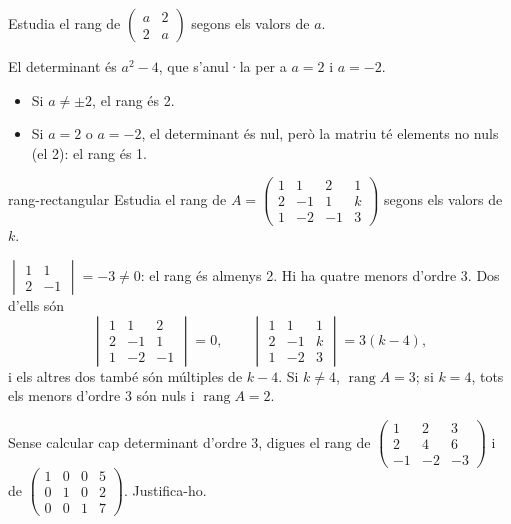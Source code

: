 \begin{apartats}

Estudia el rang de $\begin{pmatrix}a&2\\2&a\end{pmatrix}$ segons els valors de $a$.

\begin{solucio}
El determinant és $a^2-4$, que s'anul·la per a $a=2$ i $a=-2$.
\begin{itemize}
\item Si $a\ne\pm2$, el rang és 2.
\item Si $a=2$ o $a=-2$, el determinant és nul, però la matriu té elements no nuls (el 2): el rang és 1.
\end{itemize}
\end{solucio}

\begin{tria}{rang-rectangular}
Estudia el rang de $A=\begin{pmatrix}1&1&2&1\\2&-1&1&k\\1&-2&-1&3\end{pmatrix}$ segons els valors de $k$.

\begin{solucio}
$\begin{vmatrix}1&1\\2&-1\end{vmatrix}=-3\ne0$: el rang és almenys 2. Hi ha quatre menors d'ordre 3. Dos
d'ells són
\[
\begin{vmatrix}1&1&2\\2&-1&1\\1&-2&-1\end{vmatrix}=0,\qquad
\begin{vmatrix}1&1&1\\2&-1&k\\1&-2&3\end{vmatrix}=3(k-4),
\]
i els altres dos també són múltiples de $k-4$. Si $k\ne4$, $\operatorname{rang}A=3$; si $k=4$, tots els
menors d'ordre 3 són nuls i $\operatorname{rang}A=2$.
\end{solucio}

Sense calcular cap determinant d'ordre 3, digues el rang de
$\begin{pmatrix}1&2&3\\2&4&6\\-1&-2&-3\end{pmatrix}$ i de
$\begin{pmatrix}1&0&0&5\\0&1&0&2\\0&0&1&7\end{pmatrix}$. Justifica-ho.


\end{tria}
\end{apartats}
